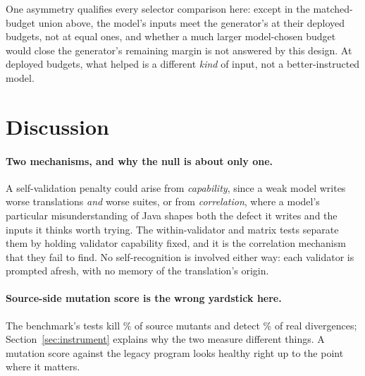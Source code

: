 \documentclass[sigconf]{acmart}
\begin{document}
One asymmetry qualifies every selector comparison here: except in the matched-budget union
above, the model's \KParity{} inputs meet the generator's \NFuzz{} at their deployed budgets,
not at equal ones, and whether a much larger model-chosen budget would close the generator's
remaining margin is not answered by this design. At deployed budgets, what helped is a
different \emph{kind} of input, not a better-instructed model.

\section{Discussion}

\paragraph{Two mechanisms, and why the null is about only one.}
A self-validation penalty could arise from \emph{capability}, since a weak model writes worse
translations \emph{and} worse suites, or from \emph{correlation}, where a model's particular
misunderstanding of Java shapes both the defect it writes and the inputs it thinks worth trying.
The within-validator and matrix tests separate them by holding validator capability fixed, and
it is the correlation mechanism that they fail to find.
No self-recognition is involved either way: each validator is prompted afresh, with no memory
of the translation's origin.

\paragraph{Source-side mutation score is the wrong yardstick here.}
The benchmark's tests kill \CtwoBenchKill\% of source mutants and detect \BenchDetect\% of real
divergences; Section~\ref{sec:instrument} explains why the two measure different things. A
mutation score against the legacy program looks healthy right up to the point where it matters.
\end{document}
